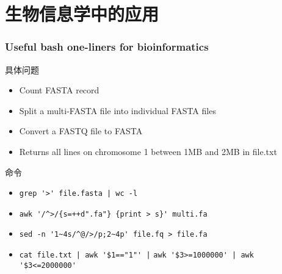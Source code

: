 \section{生物信息学中的应用}
\begin{frame}[fragile]
  \frametitle{Useful bash one-liners for bioinformatics}
  \begin{block}{具体问题}
    \begin{itemize}
      \item<2-> Count FASTA record
      \item<4-> Split a multi-FASTA file into individual FASTA files
      \item<6-> Convert a FASTQ file to FASTA 
      \item<8-> Returns all lines on chromosome 1 between 1MB and 2MB in file.txt 
    \end{itemize}
  \end{block}
  \begin{block}{命令}
    \begin{itemize}
      \item<3-> \verb=grep '>' file.fasta | wc -l=
      \item<5-> \verb|awk '/^>/{s=++d".fa"} {print > s}' multi.fa|
      \item<7-> \verb|sed -n '1~4s/^@/>/p;2~4p' file.fq > file.fa|
      \item<9-> \verb~cat file.txt | awk '$1=="1"' |~ 
	\verb~awk '$3>=1000000' | awk '$3<=2000000'~
    \end{itemize}
  \end{block}
\end{frame}

